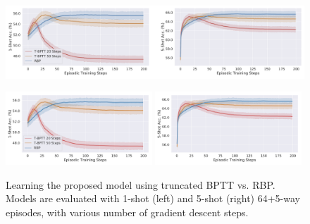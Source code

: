 \begin{figure}[t]
\label{fig:bptt}
\iflatexml
\includegraphics[width=6\textwidth]{figures/bptt.png}
\else
\begin{minipage}[c]{\textwidth}
\centering
\includegraphics[width=0.49\textwidth,trim={0cm 0cm 0cm 0cm},clip]{figures/example.pdf}
\hfill
\includegraphics[width=0.49\textwidth,trim={0cm 0cm 0cm 0cm},clip]{figures/example-s5.pdf}
\end{minipage}
\fi
\caption{Learning the proposed model using truncated BPTT vs. RBP. Models
are evaluated with 1-shot (left) and 5-shot (right) 64+5-way episodes,
with various number of gradient descent steps.}
\label{fig:bptt}
\end{figure}